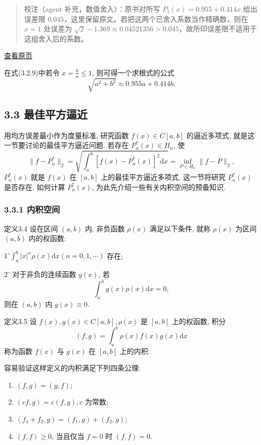 \documentclass[
  10pt,
  fontset=fandol]{ctexart}
\begin{document}
\begin{quote}
校注（agent 补充，数值舍入）：原书对所写 \(P_1(x)=0.955+0.414x\) 给出误差限 \(0.045\)，这里保留原文。若把这两个已舍入系数当作精确数，则在 \(x=1\) 处误差为 \(\sqrt2-1.369\approx0.04521356>0.045\)，故所印误差限不适用于这组舍入后的系数。
\end{quote}

\href{../../source-images/pdf-065.jpeg}{查看原页}

在式(3.2.9)中若令 \(x = \frac{b}{a} \leqslant 1\), 则可得一个求根式的公式 \[
\sqrt{a^2 + b^2} \approx 0.955a + 0.414b.
\]

\subsection{3.3 最佳平方逼近}\label{ux6700ux4f73ux5e73ux65b9ux903cux8fd1}

用均方误差最小作为度量标准, 研究函数 \(f(x) \in C[a,b]\) 的逼近多项式, 就是这一节要讨论的最佳平方逼近问题. 若存在 \(P_n^*(x) \in H_n\), 使 \[
\|f - P_n^*\|_2 = \sqrt{\int_a^b [f(x) - P_n^*(x)]^2 \mathrm{d}x} = \inf_{P \in H_n} \|f - P\|_2, \tag{3.3.1}
\] \(P_n^*(x)\) 就是 \(f(x)\) 在 \([a,b]\) 上的最佳平方逼近多项式. 这一节将研究 \(P_n^*(x)\) 是否存在, 如何计算 \(P_n^*(x)\), 为此先介绍一些有关内积空间的预备知识.

\subsubsection{3.3.1 内积空间}\label{ux5185ux79efux7a7aux95f4}

定义3.4 设在区间 \((a,b)\) 内, 非负函数 \(\rho(x)\) 满足以下条件, 就称 \(\rho(x)\) 为区间 \((a,b)\) 内的权函数:

\(1^\circ \int_a^b |x|^n \rho(x) \mathrm{d}x (n = 0,1,\cdots)\) 存在;

\(2^\circ\) 对于非负的连续函数 \(g(x)\), 若 \[
\int_a^b g(x) \rho(x) \mathrm{d}x = 0, \tag{3.3.2}
\] 则在 \((a,b)\) 内 \(g(x) \equiv 0\).

定义3.5 设 \(f(x), g(x) \in C[a,b], \rho(x)\) 是 \([a,b]\) 上的权函数, 积分 \[
(f,g) = \int_a^b \rho(x) f(x) g(x) \mathrm{d}x \tag{3.3.3}
\] 称为函数 \(f(x)\) 与 \(g(x)\) 在 \([a,b]\) 上的内积.

容易验证这样定义的内积满足下列四条公理:

\begin{enumerate}
\def\labelenumi{(\arabic{enumi})}
\item
  \((f,g) = (g,f)\);
\item
  \((cf,g) = c(f,g), c\) 为常数;
\item
  \((f_1 + f_2, g) = (f_1, g) + (f_2, g)\);
\item
  \((f,f) \geqslant 0\), 当且仅当 \(f=0\) 时 \((f,f)=0\).
\end{enumerate}
\end{document}
